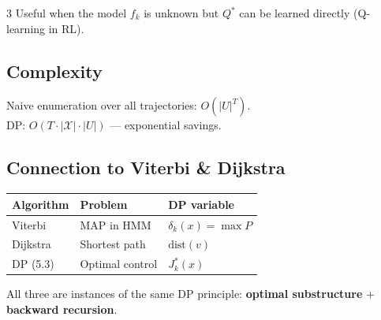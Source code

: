 \documentclass[9pt,landscape]{article}
\begin{document}
\begin{multicols}{3}
Useful when the model $f_k$ is unknown but $Q^*$ can be learned directly (Q-learning in RL).

\subsection{Complexity}
Naive enumeration over all trajectories: $O(|U|^T)$.\\
DP: $O(T \cdot |\mathcal{X}| \cdot |U|)$ — exponential savings.

\subsection{Connection to Viterbi \& Dijkstra}
\begin{tabular}{@{}p{1.8cm}p{1.5cm}p{2.2cm}@{}}
\toprule
\textbf{Algorithm} & \textbf{Problem} & \textbf{DP variable}\\
\midrule
Viterbi & MAP in HMM & $\delta_k(x) = \max P$\\
Dijkstra & Shortest path & $\mathrm{dist}(v)$\\
DP (5.3) & Optimal control & $J_k^*(x)$\\
\bottomrule
\end{tabular}

\vspace{4pt}
All three are instances of the same DP principle: \textbf{optimal substructure} + \textbf{backward recursion}.

\end{multicols}
\end{document}
